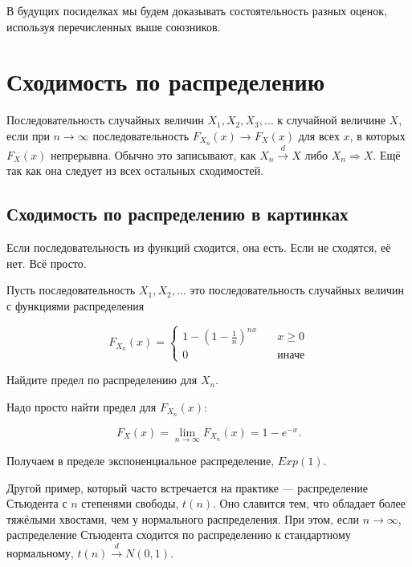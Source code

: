 \documentclass[12pt, a4paper, oneside]{article}
\begin{document}
В будущих посиделках мы будем доказывать состоятельность разных оценок, используя перечисленных выше союзников. 


\section{Сходимость по распределению}

\begin{definition} 
Последовательность случайных величин $X_1, X_2, X_3, \ldots$  к случайной величине $X$, если при $n \to \infty$ последовательность $F_{X_n}(x) \to F_X(x)$ для всех $x$, в которых $F_X(x)$ непрерывна. Обычно это записывают, как $X_n \overset{d}{\to} X$ либо $X_n \Rightarrow X$. Ещё  так как она следует из всех остальных сходимостей. 
\end{definition}

\subsection{Сходимость по распределению в картинках}

Если последовательность из функций сходится, она есть. Если не сходятся, её нет. Всё просто. 

\begin{problem}{ } 
Пусть последовательность $X_1, X_2, \ldots $ это последовательность случайных величин с функциями распределения 

$$
F_{X_n}(x) = \begin{cases} 1 - \left(1 - \frac{1}{n} \right)^{nx} \quad& x \ge 0 \\ 0 \quad & \text{иначе} \end{cases}
$$

Найдите предел по распределению для $X_n$. 
\end{problem} 

\begin{sol}
Надо просто найти предел для $F_{X_n}(x)$: 

$$
F_X(x) = \lim_{n \to \infty} F_{X_n}(x) = 1 - e^{-x}.
$$

Получаем в пределе экспоненциальное распределение, $Exp(1)$. 
\end{sol}

Другой пример, который часто встречается на практике --- распределение Стьюдента с $n$ степенями свободы, $t(n)$. Оно славится тем, что обладает более тяжёлыми хвостами, чем у нормального распределения. При этом, если $n \to \infty$, распределение Стьюдента сходится по распределению к стандартному нормальному, $t(n) \overset{d}{\to} N(0,1).$ 
\end{document}
